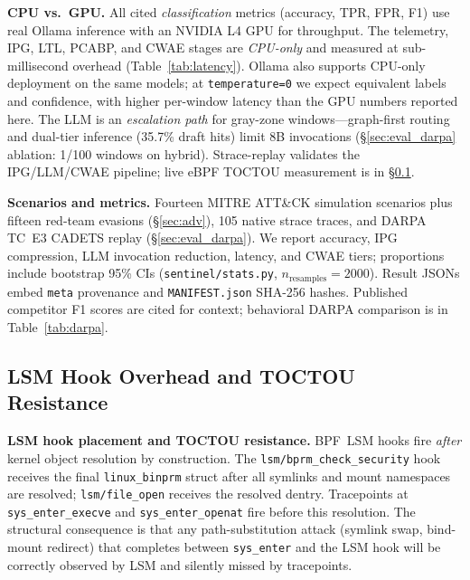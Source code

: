 \documentclass[journal]{IEEEtran}
\begin{document}
\noindent\textbf{CPU vs.\ GPU.}
All cited \emph{classification} metrics (accuracy, TPR, FPR, F1) use real
Ollama inference with an NVIDIA L4 GPU for throughput.
The telemetry, IPG, LTL, PCABP, and CWAE stages are \emph{CPU-only} and
measured at sub-millisecond overhead (Table~\ref{tab:latency}).
Ollama also supports CPU-only deployment on the same models; at
\texttt{temperature=0} we expect equivalent labels and confidence, with
higher per-window latency than the GPU numbers reported here.
The LLM is an \emph{escalation path} for gray-zone windows---graph-first
routing and dual-tier inference (35.7\% draft hits) limit 8B invocations
(\S\ref{sec:eval_darpa} ablation: 1/100 windows on hybrid).
Strace-replay validates the IPG/LLM/CWAE pipeline; live eBPF TOCTOU
measurement is in \S\ref{sec:eval_lsm}.

\noindent\textbf{Scenarios and metrics.}
Fourteen MITRE ATT\&CK simulation scenarios plus fifteen red-team evasions
(\S\ref{sec:adv}), 105 native strace traces, and DARPA TC~E3 CADETS replay
(\S\ref{sec:eval_darpa}).  We report accuracy, IPG compression, LLM invocation
reduction, latency, and CWAE tiers; proportions include bootstrap 95\% CIs
(\texttt{sentinel/stats.py}, $n_{\text{resamples}}{=}2000$).  Result JSONs
embed \texttt{meta} provenance and \texttt{MANIFEST.json} SHA-256 hashes.
Published competitor F1 scores are cited for context; behavioral DARPA
comparison is in Table~\ref{tab:darpa}.

\subsection{LSM Hook Overhead and TOCTOU Resistance}\label{sec:eval_lsm}

\noindent\textbf{LSM hook placement and TOCTOU resistance.}
BPF~LSM hooks fire \emph{after} kernel object resolution by construction.
The \texttt{lsm/bprm\_check\_security} hook receives the final
\texttt{linux\_binprm} struct after all symlinks and mount namespaces are
resolved; \texttt{lsm/file\_open} receives the resolved dentry.
Tracepoints at \texttt{sys\_enter\_execve} and \texttt{sys\_enter\_openat}
fire before this resolution.  The structural consequence is that any
path-substitution attack (symlink swap, bind-mount redirect) that completes
between \texttt{sys\_enter} and the LSM hook will be correctly observed by
LSM and silently missed by tracepoints.
\end{document}
